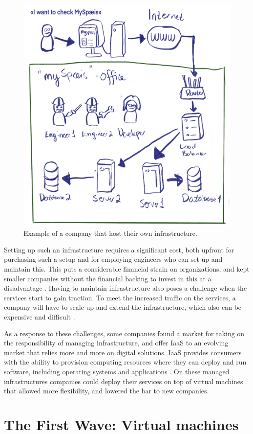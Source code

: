 \documentclass[
  table]{report}
\begin{document}
\begin{figure}[H]
\centering
  \includegraphics[width=0.7\columnwidth]{assets/2.1-before-the-waves-2.png}
  \caption{Example of a company that host their own infrastructure.}
  \label{fig:myspeis}
\end{figure}

Setting up such an infrastructure requires a significant cost, both
upfront for purchasing such a setup and for employing engineers who can
set up and maintain this. This puts a considerable financial strain on
organizations, and kept smaller companies without the financial backing
to invest in this at a disadvantage \citep{etroEconomicImpactCloud2009}.
Having to maintain infrastructure also poses a challenge when the
services start to gain traction. To meet the increased traffic on the
services, a company will have to scale up and extend the infrastructure,
which also can be expensive and difficult
\citep{armbrustViewCloudComputing2010}.

As a response to these challenges, some companies found a market for
taking on the responsibility of managing infrastructure, and offer
\ac{IaaS} to an evolving market that relies more and more on digital
solutions. \ac{IaaS} provides consumers with the ability to provision
computing resources where they can deploy and run software, including
operating systems and applications \citep{nist-def}. On these managed
infrastructures companies could deploy their services on top of virtual
machines that allowed more flexibility, and lowered the bar to new
companies.

\section{The First Wave: Virtual machines}
\label{sect:first-wave}
\end{document}
